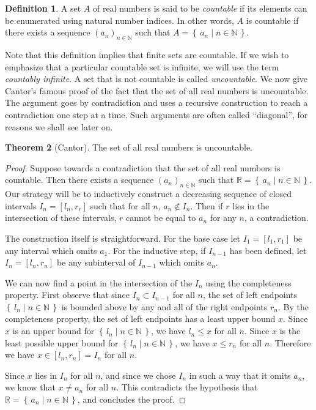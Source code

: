 \documentclass[11pt,oneside]{amsart}
\newcommand{\set}[1]{\left\{\,#1\,\right\}}
\newcommand{\NN}{\mathbb N}
\newcommand{\RR}{\mathbb R}
\theoremstyle{definition}
\newtheorem{thm}{Theorem}[section]
\theoremstyle{definition}
\newtheorem{defn}[thm]{Definition}
\theoremstyle{remark}
\begin{document}
\begin{defn}
  A set $A$ of real numbers is said to be \emph{countable} if its elements can be enumerated using natural number indices. In other words, $A$ is countable if there exists a sequence $(a_n)_{n\in\NN}$ such that $A=\set{a_n\mid n\in\NN}$.
\end{defn}

Note that this definition implies that finite sets are countable. If we wish to emphasize that a particular countable set is infinite, we will use the term \emph{countably infinite}. A set that is not countable is called \emph{uncountable}. We now give Cantor's famous proof of the fact that the set of all real numbers is uncountable. The argument goes by contradiction and uses a recursive construction to reach a contradiction one step at a time. Such arguments are often called ``diagonal'', for reasons we shall see later on.

\begin{thm}[Cantor]
  \label{thm:cantor}
  The set of all real numbers is uncountable.
\end{thm}

\begin{proof}
  Suppose towards a contradiction that the set of all real numbers is countable. Then there exists a sequence $(a_n)_{n\in\NN}$ such that $\RR=\set{a_n\mid n\in\NN}$. Our strategy will be to inductively construct a decreasing sequence of closed intervals $I_n=[l_n,r_r]$ such that for all $n$, $a_n\notin I_n$. Then if $r$ lies in the intersection of these intervals, $r$ cannot be equal to $a_n$ for any $n$, a contradiction.

The construction itself is straightforward. For the base case let $I_1=[l_1,r_1]$ be any interval which omits $a_1$. For the inductive step, if $I_{n-1}$ has been defined, let $I_n=[l_n,r_n]$ be any subinterval of $I_{n-1}$ which omits $a_n$.

We can now find a point in the intersection of the $I_n$ using the completeness property. First observe that since $I_n\subset I_{n-1}$ for all $n$, the set of left endpoints $\set{l_n\mid n\in\NN}$ is bounded above by any and all of the right endpoints $r_n$. By the completeness property, the set of left endpoints has a least upper bound $x$. Since $x$ is an upper bound for $\set{l_n\mid n\in\NN}$, we have $l_n\leq x$ for all $n$. Since $x$ is the least possible upper bound for $\set{l_n\mid n\in\NN}$, we have $x\leq r_n$ for all $n$. Therefore we have $x\in[l_n,r_n]=I_n$ for all $n$.

Since $x$ lies in $I_n$ for all $n$, and since we chose $I_n$ in such a way that it omits $a_n$, we know that $x\neq a_n$ for all $n$. This contradicts the hypothesis that $\RR=\set{a_n\mid n\in\NN}$, and concludes the proof.
\end{proof}
\end{document}
